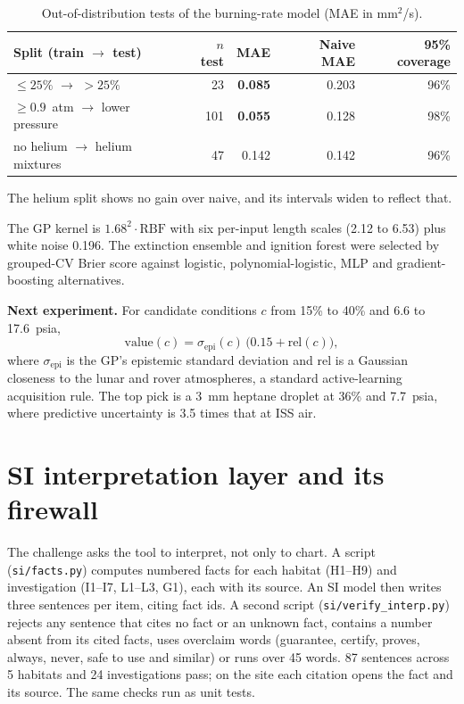 \documentclass[10pt,letterpaper]{article}
\newcommand{\Otwo}{\ce{O2}}
\begin{document}
\begin{table}[h]
\centering\small
\caption{Out-of-distribution tests of the burning-rate model (MAE in mm$^2$/s).}\label{tab:ood}
\begin{tabular}{@{}lrrrr@{}}
\toprule
Split (train $\rightarrow$ test) & $n$ test & MAE & Naive MAE & 95\% coverage \\
\midrule
\Otwo{} $\le 25\%$ $\rightarrow$ \Otwo{} $>25\%$ & 23 & \textbf{0.085} & 0.203 & 96\% \\
$\ge 0.9$~atm $\rightarrow$ lower pressure & 101 & \textbf{0.055} & 0.128 & 98\% \\
no helium $\rightarrow$ helium mixtures & 47 & 0.142 & 0.142 & 96\% \\
\bottomrule
\end{tabular}
\par\smallskip\footnotesize The helium split shows no gain over naive, and its intervals widen to reflect that.
\end{table}

The GP kernel is $1.68^2\cdot\mathrm{RBF}$ with six per-input length scales (2.12 to 6.53) plus white noise 0.196. The extinction ensemble and ignition forest were selected by grouped-CV Brier score against logistic, polynomial-logistic, MLP and gradient-boosting alternatives.

\textbf{Next experiment.} For candidate conditions $c$ from 15\% to 40\% \Otwo{} and 6.6 to 17.6~psia,
\begin{equation}
\text{value}(c)=\sigma_{\text{epi}}(c)\,\big(0.15+\mathrm{rel}(c)\big),
\end{equation}
where $\sigma_{\text{epi}}$ is the GP's epistemic standard deviation and $\mathrm{rel}$ is a Gaussian closeness to the lunar and rover atmospheres, a standard active-learning acquisition rule. The top pick is a 3~mm heptane droplet at 36\% \Otwo{} and 7.7~psia, where predictive uncertainty is 3.5 times that at ISS air.

\section{SI interpretation layer and its firewall}
The challenge asks the tool to interpret, not only to chart. A script (\texttt{si/facts.py}) computes numbered facts for each habitat (H1--H9) and investigation (I1--I7, L1--L3, G1), each with its source. An SI model then writes three sentences per item, citing fact ids. A second script (\texttt{si/verify\_interp.py}) rejects any sentence that cites no fact or an unknown fact, contains a number absent from its cited facts, uses overclaim words (guarantee, certify, proves, always, never, safe to use and similar) or runs over 45 words. 87 sentences across 5 habitats and 24 investigations pass; on the site each citation opens the fact and its source. The same checks run as unit tests.
\end{document}
